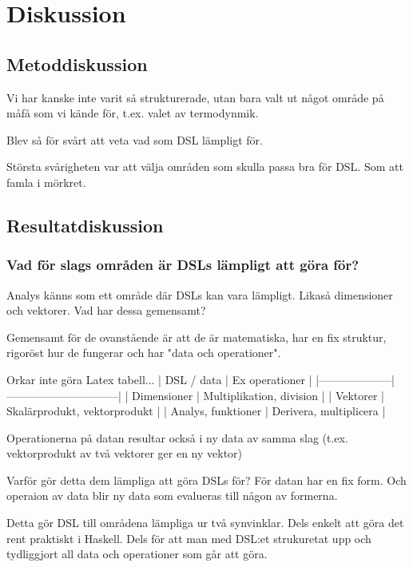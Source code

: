 
\chapter{Diskussion}

\begin{binge}
\section{Metoddiskussion}

Vi har kanske inte varit så strukturerade, utan bara valt ut något område på måfå som vi kände för, t.ex. valet av termodynmik.

Blev så för svårt att veta vad som DSL lämpligt för.

Största svårigheten var att välja områden som skulla passa bra för DSL. Som att
famla i mörkret.

\section{Resultatdiskussion}

\subsection{Vad för slags områden är DSLs lämpligt att göra för?}

Analys känns som ett område där DSLs kan vara lämpligt. Likaså dimensioner och
vektorer. Vad har dessa gemensamt?

Gemensamt för de ovanstående är att de är matematiska, har en fix struktur,
rigoröst hur de fungerar och har "data och operationer".

Orkar inte göra Latex tabell...
| DSL / data         | Ex operationer               |
|--------------------|------------------------------|
| Dimensioner        | Multiplikation, division     |
| Vektorer           | Skalärprodukt, vektorprodukt |
| Analys, funktioner | Derivera, multiplicera       |

Operationerna på datan resultar också i ny data av samma slag (t.ex.
vektorprodukt av två vektorer ger en ny vektor)

Varför gör detta dem lämpliga att göra DSLs för? För datan har en fix form. Och
operaion av data blir ny data som evalueras till någon av formerna.

Detta gör DSL till områdena lämpliga ur två synvinklar. Dels enkelt att göra
det rent praktiskt i Haskell. Dels för att man med DSL:et strukuretat upp och
tydliggjort all data och operationer som går att göra.


\end{binge}

